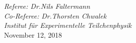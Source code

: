 \begin{titlepage}
\begin{addmargin}[1.5cm]{0cm}
\begin{center}
{  %
  \large{\textit{Referee: Dr.\;Nils Faltermann}}\\
  \large{\textit{Co-Referee: Dr.\;Thorsten Chwalek}}\\
   \vspace{0.2 cm}
\large{\textit{Institut f\"ur Experimentelle Teilchenphysik}}\\


  \vspace{1.0cm}
  \large{November 12, 2018}%
}
\end{center}
\end{addmargin}
\end{titlepage}
